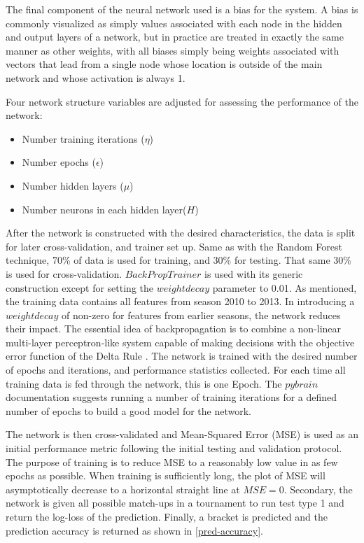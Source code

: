 \documentclass[conference]{IEEEtran}
\begin{document}
{The final component of the neural network used is a bias for the system.
A bias is commonly visualized as simply values associated with each node in the hidden and output layers of a network, but in practice are treated in exactly the same manner as other weights, with all biases simply being weights associated with vectors that lead from a single node whose location is outside of the main network and whose activation is always 1.

Four network structure variables are adjusted for assessing the performance of the network:
\begin{itemize}
\item Number training iterations ($\eta$)
\item Number epochs ($\epsilon$)
\item Number hidden layers ($\mu$)
\item Number neurons in each hidden layer($H$)
\end{itemize}

After the network is constructed with the desired characteristics, the data is split for later cross-validation, and trainer set up.
Same as with the Random Forest technique, 70\% of data is used for training, and 30\% for testing. 
That same 30\% is used for cross-validation.
$BackPropTrainer$ is used with its generic construction except for setting the $weightdecay$ parameter to 0.01.
As mentioned, the training data contains all features from season 2010 to 2013.
In introducing a $weightdecay$ of non-zero for features from earlier seasons, the network reduces their impact.
The essential idea of backpropagation is to combine a non-linear multi-layer perceptron-like system capable of making decisions with the objective error function of the Delta Rule \cite{McClelland-1988}.
The network is trained with the desired number of epochs and iterations, and performance statistics collected.
For each time all training data is fed through the network, this is one Epoch.
The $pybrain$ documentation suggests running a number of training iterations for a defined number of epochs to build a good model for the network.

The network is then cross-validated and Mean-Squared Error (MSE) is used as an initial performance metric following the initial testing and validation protocol.
The purpose of training is to reduce MSE to a reasonably low value in as few epochs as possible.
When training is sufficiently long, the plot of MSE will asymptotically decrease to a horizontal straight line at $MSE = 0$.
Secondary, the network is given all possible match-ups in a tournament to run test type 1 and return the log-loss of the prediction.
Finally, a bracket is predicted and the prediction accuracy is returned as shown in \eqref{pred-accuracy}.

}
\end{document}
